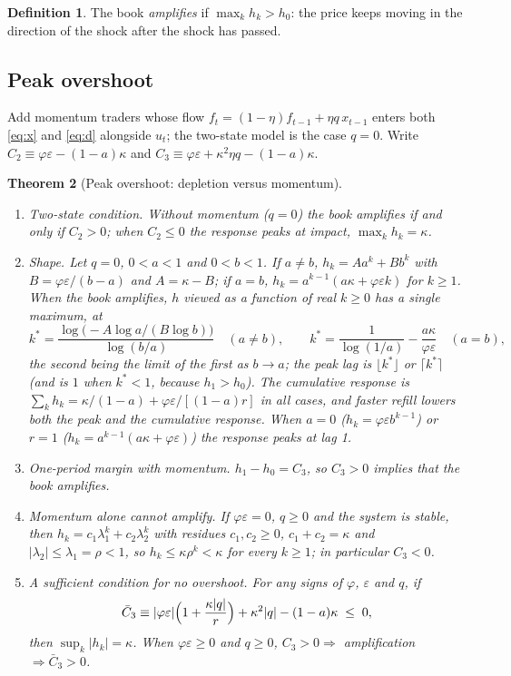 \documentclass[12pt]{article}
\newtheorem{theorem}{Theorem}[section]
\theoremstyle{definition}
\newtheorem{definition}[theorem]{Definition}
\theoremstyle{remark}
\begin{document}
\begin{definition}
The book \emph{amplifies} if $\max_kh_k>h_0$: the price keeps moving in the direction of the shock after the shock has passed.
\end{definition}

\subsection{Peak overshoot}

Add momentum traders whose flow $f_t=(1-\eta)f_{t-1}+\eta q\,x_{t-1}$ enters both \eqref{eq:x} and \eqref{eq:d} alongside $u_t$; the two-state model is the case $q=0$. Write $C_2\equiv\varphi\varepsilon-(1-a)\kappa$ and $C_3\equiv\varphi\varepsilon+\kappa^2\eta q-(1-a)\kappa$.

\begin{theorem}[Peak overshoot: depletion versus momentum]\label{thm:peak}
\begin{enumerate}[label=(\roman*)]
\item\label{thm:t6} \emph{Two-state condition.} Without momentum ($q=0$) the book amplifies if and only if $C_2>0$; when $C_2\le0$ the response peaks at impact, $\max_kh_k=\kappa$.
\item\label{prop:shape} \emph{Shape.} Let $q=0$, $0<a<1$ and $0<b<1$. If $a\neq b$, $h_k=Aa^k+Bb^k$ with $B=\varphi\varepsilon/(b-a)$ and $A=\kappa-B$; if $a=b$, $h_k=a^{k-1}(a\kappa+\varphi\varepsilon k)$ for $k\ge1$. When the book amplifies, $h$ viewed as a function of real $k\ge0$ has a single maximum, at
\[
k^*=\frac{\log\bigl(-A\log a/(B\log b)\bigr)}{\log(b/a)}\quad(a\neq b),\qquad k^*=\frac1{\log(1/a)}-\frac{a\kappa}{\varphi\varepsilon}\quad(a=b),
\]
the second being the limit of the first as $b\to a$; the peak lag is $\lfloor k^*\rfloor$ or $\lceil k^*\rceil$ (and is $1$ when $k^*<1$, because $h_1>h_0$). The cumulative response is $\sum_kh_k=\kappa/(1-a)+\varphi\varepsilon/[(1-a)r]$ in all cases, and faster refill lowers both the peak and the cumulative response. When $a=0$ ($h_k=\varphi\varepsilon b^{k-1}$) or $r=1$ ($h_k=a^{k-1}(a\kappa+\varphi\varepsilon)$) the response peaks at lag 1.
\item\label{prop:t6m} \emph{One-period margin with momentum.} $h_1-h_0=C_3$, so $C_3>0$ implies that the book amplifies.
\item\label{thm:nomom} \emph{Momentum alone cannot amplify.} If $\varphi\varepsilon=0$, $q\ge0$ and the system is stable, then $h_k=c_1\lambda_1^k+c_2\lambda_2^k$ with residues $c_1,c_2\ge0$, $c_1+c_2=\kappa$ and $|\lambda_2|\le\lambda_1=\rho<1$, so $h_k\le\kappa\rho^k<\kappa$ for every $k\ge1$; in particular $C_3<0$.
\item\label{thm:noover} \emph{A sufficient condition for no overshoot.} For any signs of $\varphi$, $\varepsilon$ and $q$, if
\[
\bar C_3\equiv|\varphi\varepsilon|\Bigl(1+\frac{\kappa|q|}{r}\Bigr)+\kappa^2|q|-(1-a)\kappa\;\le\;0,
\]
then $\sup_k|h_k|=\kappa$. When $\varphi\varepsilon\ge0$ and $q\ge0$, $C_3>0\Rightarrow$ amplification $\Rightarrow\bar C_3>0$.
\end{enumerate}
\end{theorem}
\end{document}
